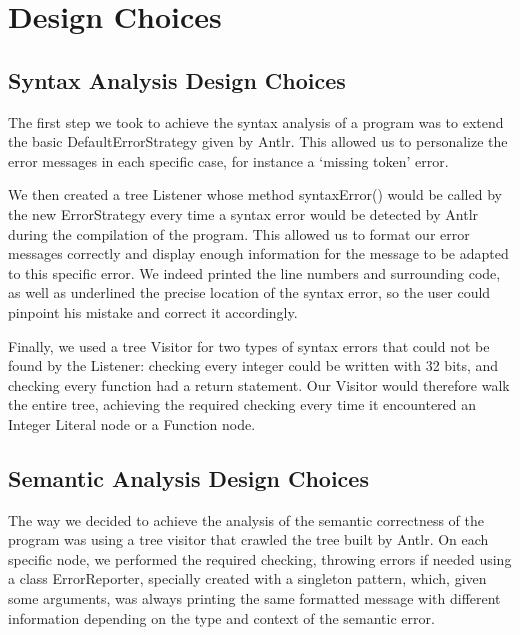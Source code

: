 \documentclass[a4wide, 11pt]{article}
\begin{document}
\section{Design Choices}

\subsection{Syntax Analysis Design Choices}

The first step we took to achieve the syntax analysis of a program was to extend the basic DefaultErrorStrategy given by Antlr. This allowed us to personalize the error messages in each specific case, for instance a `missing token' error.

\bigskip

We then created a tree Listener whose method syntaxError() would be called by the new ErrorStrategy every time a syntax error would be detected by Antlr during the compilation of the program. This allowed us to format our error messages correctly and display enough information for the message to be adapted to this specific error. We indeed printed the line numbers and surrounding code, as well as underlined the precise location of the syntax error, so the user could pinpoint his mistake and correct it accordingly. 

\bigskip

Finally, we used a tree Visitor for two types of syntax errors that could not be found by the Listener: checking every integer could be written with 32 bits, and checking every function had a return statement. Our Visitor would therefore walk the entire tree, achieving the required checking every time it encountered an Integer Literal node or a Function node.


\subsection{Semantic Analysis Design Choices}

The way we decided to achieve the analysis of the semantic correctness of the program was using a tree visitor that crawled the tree built by Antlr. On each specific node, we performed the required checking, throwing errors if needed using a class ErrorReporter, specially created with a singleton pattern, which, given some arguments, was always printing the same formatted message with different information depending on the type and context of the semantic error.

\bigskip
\end{document}

